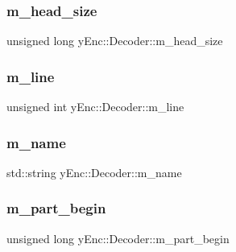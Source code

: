 \hypertarget{classy_enc_1_1_decoder_ac1a7d0f668504321d1141f16672b61cb}{}\label{classy_enc_1_1_decoder_ac1a7d0f668504321d1141f16672b61cb} 
\subsubsection{\texorpdfstring{m\+\_\+head\+\_\+size}{m\_head\_size}}
{\footnotesize\ttfamily unsigned long y\+Enc\+::\+Decoder\+::m\+\_\+head\+\_\+size\hspace{0.3cm}{\ttfamily [protected]}}

\hypertarget{classy_enc_1_1_decoder_a43dd2c6ca202f5a351554669136962a7}{}\label{classy_enc_1_1_decoder_a43dd2c6ca202f5a351554669136962a7} 
\subsubsection{\texorpdfstring{m\+\_\+line}{m\_line}}
{\footnotesize\ttfamily unsigned int y\+Enc\+::\+Decoder\+::m\+\_\+line\hspace{0.3cm}{\ttfamily [protected]}}

\hypertarget{classy_enc_1_1_decoder_a0cf2e8181fd9d392207221101c415d33}{}\label{classy_enc_1_1_decoder_a0cf2e8181fd9d392207221101c415d33} 
\subsubsection{\texorpdfstring{m\+\_\+name}{m\_name}}
{\footnotesize\ttfamily std\+::string y\+Enc\+::\+Decoder\+::m\+\_\+name\hspace{0.3cm}{\ttfamily [protected]}}

\hypertarget{classy_enc_1_1_decoder_a6e33e34da040edb96b57f1b9311b3ac5}{}\label{classy_enc_1_1_decoder_a6e33e34da040edb96b57f1b9311b3ac5} 
\subsubsection{\texorpdfstring{m\+\_\+part\+\_\+begin}{m\_part\_begin}}
{\footnotesize\ttfamily unsigned long y\+Enc\+::\+Decoder\+::m\+\_\+part\+\_\+begin\hspace{0.3cm}{\ttfamily [protected]}}


